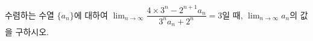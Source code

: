 수렴하는 수열 $\{a_n\}$에 대하여 $\displaystyle\lim_{n\to\infty}\dfrac{4\times 3^n-2^{n+1}a_n}{3^na_n+2^n}=3$일 때, $\displaystyle\lim_{n\to\infty}a_n$의 값을 구하시오.
